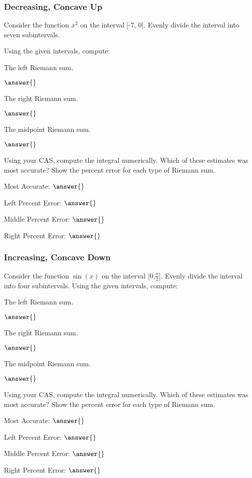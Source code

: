 \documentclass{ximera}
\begin{document}
\subsubsection{Decreasing, Concave Up}
\begin{question}
Consider the function $x^2$ on the interval [-7, 0]. Evenly divide the interval into seven subintervals.

Using the given intervals, compute:

The left Riemann sum.

$\answer{}$

The right Riemann sum.

$\answer{}$

The midpoint Riemann sum.

$\answer{}$

Using your CAS, compute the integral numerically. Which of these estimates was most accurate? Show the percent error for each type of Riemann sum.

Most Accurate: $\answer{}$

Left Percent Error: $\answer{}$

Middle Percent Error: $\answer{}$

Right Percent Error: $\answer{}$
\end{question}

\subsubsection{Increasing, Concave Down}
\begin{question}
Consider the function $\sin(x)$ on the interval [0,$\frac{\pi}{2}$]. Evenly divide the interval into four subintervals.
Using the given intervals, compute:

The left Riemann sum.

$\answer{}$

The right Riemann sum.

$\answer{}$

The midpoint Riemann sum.

$\answer{}$

Using your CAS, compute the integral numerically. Which of these estimates was most accurate? Show the percent error for each type of Riemann sum.

Most Accurate: $\answer{}$

Left Percent Error: $\answer{}$

Middle Percent Error: $\answer{}$

Right Percent Error: $\answer{}$
\end{question}
\end{document}
